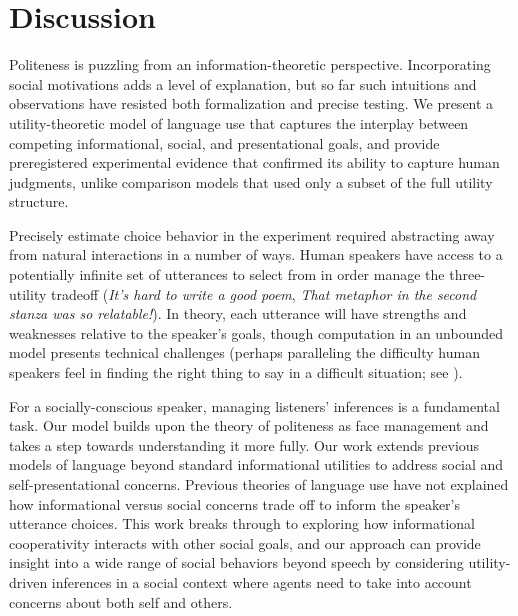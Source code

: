 \documentclass[9pt,twocolumn,twoside,lineno]{main_class_file}
\begin{document}
\section*{Discussion}

Politeness is puzzling from an information-theoretic perspective.
Incorporating social motivations adds a level of explanation, but so far such intuitions and observations have resisted both formalization and precise testing.
We present a utility-theoretic model of language use that captures the interplay between competing
informational, social, and presentational goals, and provide preregistered
experimental evidence that confirmed its ability to capture human
judgments, unlike comparison models that used only a subset of the full
utility structure.

Precisely estimate choice behavior in the experiment required abstracting away 
from natural interactions in a number of ways. 
Human speakers have access
to a potentially infinite set of utterances to select from in order manage the three-utility tradeoff (\emph{It's hard to write a good poem}, \emph{That
metaphor in the second stanza was so relatable!}). In theory,
each utterance will have strengths and weaknesses relative to the
speaker's goals, though computation in an unbounded model presents
technical challenges (perhaps paralleling the difficulty human speakers
feel in finding the right thing to say in a difficult situation; see \cite{goodman2016}).

For a socially-conscious speaker, managing listeners' inferences is a
fundamental task. Our model builds upon the theory of politeness as face
management \cite{brown1987} and takes a step towards
understanding it more fully. Our work extends previous models of language beyond
standard informational utilities to address social and
self-presentational concerns. Previous theories of language use have not
explained how informational versus social concerns trade off to inform
the speaker's utterance choices. This work breaks through to exploring how informational cooperativity interacts
with other social goals, and our approach can provide insight into a wide range of social behaviors beyond speech by considering utility-driven inferences in a
social context \cite{baker2017rational, hamlin2013mentalistic} where agents need to take
into account concerns about both self and others.
\end{document}
